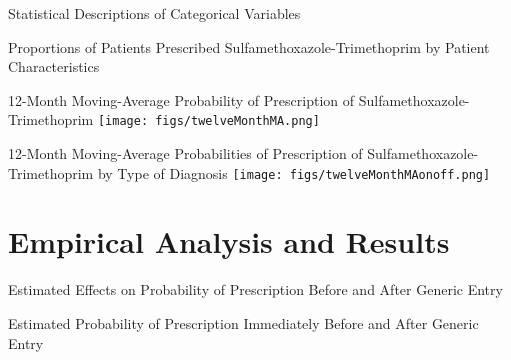 \documentclass{beamer}
\begin{document}
\begin{frame}{Statistical Descriptions of Categorical Variables}
\scalebox{.65}{}
\end{frame}

\begin{frame}{Proportions of Patients Prescribed Sulfamethoxazole-Trimethoprim by Patient Characteristics}
\begin{center}
\scalebox{.5}{}
\end{center}
\end{frame}

\begin{frame}{12-Month Moving-Average Probability of Prescription of Sulfamethoxazole-Trimethoprim}
\texttt{[image: figs/twelveMonthMA.png]}
\end{frame}

\begin{frame}{12-Month Moving-Average Probabilities of Prescription of Sulfamethoxazole-Trimethoprim by Type of Diagnosis}
\texttt{[image: figs/twelveMonthMAonoff.png]}
\end{frame}


\section{Empirical Analysis and Results}
\begin{frame}{Estimated Effects on Probability of Prescription Before and After Generic Entry}
\begin{center}
\scalebox{.45}{}
\end{center}
\end{frame}

\begin{frame}{Estimated Probability of Prescription Immediately Before and After Generic Entry}
\begin{center}
\scalebox{.6}{}
\end{center}
\end{frame}
\end{document}
